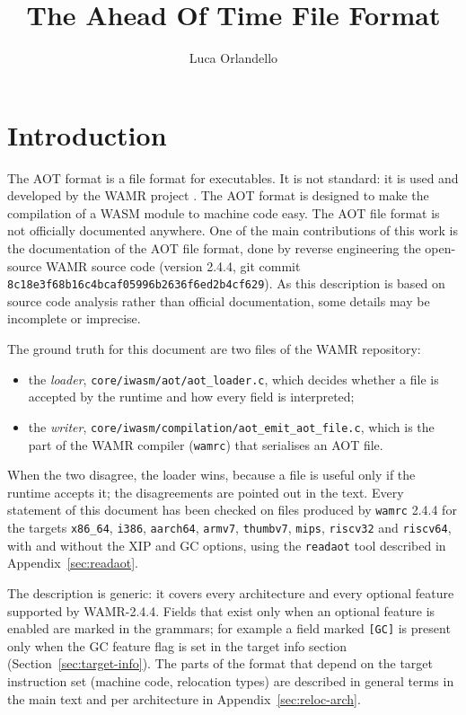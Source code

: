 \documentclass{article}
\title{The Ahead Of Time File Format}
\author{Luca Orlandello}
\begin{document}
\maketitle
\tableofcontents

\section{Introduction}
\label{chapter:aot-file-format}
The AOT format is a file format for executables. It is not standard: it is used and developed by the WAMR project \cite{wamr2026}.
The AOT format is designed to make the compilation of a WASM module to machine code easy.
The AOT file format is not officially documented anywhere.
One of the main contributions of this work is the documentation of the AOT file format, done by reverse engineering the open-source WAMR source code (version 2.4.4, git commit \texttt{8c18e3f68b16c4bcaf05996b2636f6ed2b4cf629}).
As this description is based on source code analysis rather than official documentation, some details may be incomplete or imprecise.

The ground truth for this document are two files of the WAMR repository:
\begin{itemize}
    \item the \emph{loader}, \texttt{core/iwasm/aot/aot\_loader.c}, which decides whether a file is accepted by the runtime and how every field is interpreted;
    \item the \emph{writer}, \texttt{core/iwasm/compilation/aot\_emit\_aot\_file.c}, which is the part of the WAMR compiler (\texttt{wamrc}) that serialises an AOT file.
\end{itemize}
When the two disagree, the loader wins, because a file is useful only if the runtime accepts it; the disagreements are pointed out in the text.
Every statement of this document has been checked on files produced by \texttt{wamrc} 2.4.4 for the targets \texttt{x86\_64}, \texttt{i386}, \texttt{aarch64}, \texttt{armv7}, \texttt{thumbv7}, \texttt{mips}, \texttt{riscv32} and \texttt{riscv64}, with and without the XIP and GC options, using the \texttt{readaot} tool described in Appendix~\ref{sec:readaot}.

The description is generic: it covers every architecture and every optional feature supported by WAMR-2.4.4.
Fields that exist only when an optional feature is enabled are marked in the grammars; for example a field marked \texttt{[GC]} is present only when the GC feature flag is set in the target info section (Section~\ref{sec:target-info}).
The parts of the format that depend on the target instruction set (machine code, relocation types) are described in general terms in the main text and per architecture in Appendix~\ref{sec:reloc-arch}.
\end{document}
